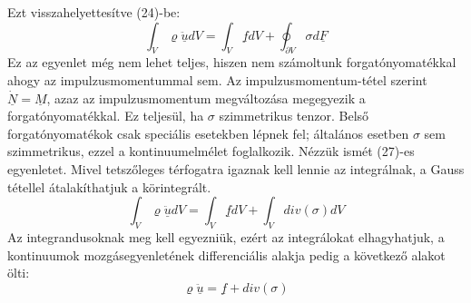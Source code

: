 \documentclass[a4paper,12pt]{article}
\begin{document}
Ezt visszahelyettesítve (24)-be:
\begin{equation}
\int_V\varrho\ddot{\underline{u}}dV=\int_V\underline{f}dV+\oint_{\partial V}\sigma d\underline{F}
\end{equation}
Ez az egyenlet még nem lehet teljes, hiszen nem számoltunk forgatónyomatékkal ahogy az impulzusmomentummal sem. Az impulzusmomentum-tétel szerint $\dot{\underline{N}}=\underline{M}$, azaz az impulzusmomentum megváltozása megegyezik a forgatónyomatékkal. Ez teljesül, ha $\sigma$ szimmetrikus tenzor. Belső forgatónyomatékok csak speciális esetekben lépnek fel; általános esetben $\sigma$ sem szimmetrikus, ezzel a kontinuumelmélet foglalkozik.
Nézzük ismét (27)-es egyenletet. Mivel tetszőleges térfogatra igaznak kell lennie az integrálnak, a Gauss tétellel átalakíthatjuk a körintegrált.
\begin{equation}
\int_V\varrho\ddot{\underline{u}}dV=\int_V\underline{f}dV+\int_{V}div(\sigma) dV
\end{equation}
Az integrandusoknak meg kell egyezniük, ezért az integrálokat elhagyhatjuk, a kontinuumok mozgásegyenletének differenciális alakja pedig a következő alakot ölti:
\begin{equation}
\varrho\ddot{\underline{u}}=\underline{f}+div(\sigma)
\end{equation}
\end{document}

